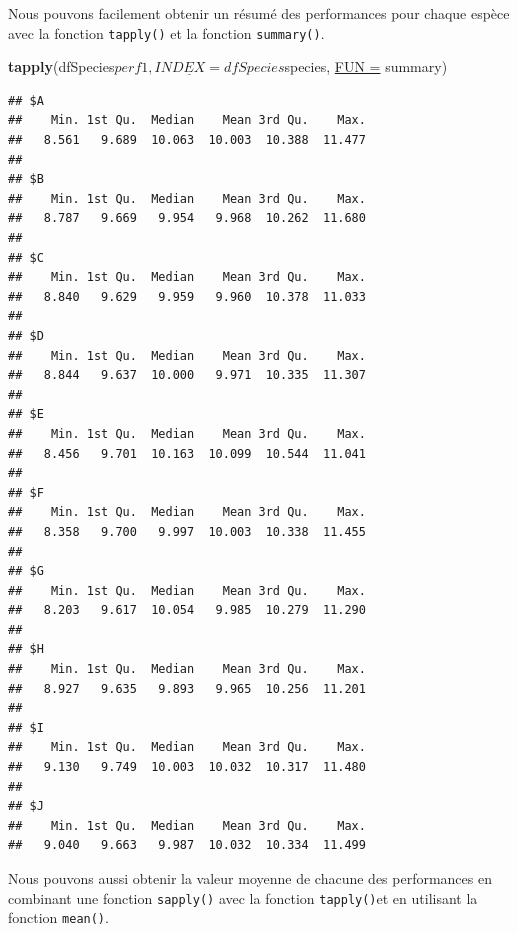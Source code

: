 \documentclass[twoside,symmetric]{book}
\newenvironment{Shaded}{}{}
\newcommand{\ControlFlowTok}[1]{\textbf{#1}}
\newcommand{\DataTypeTok}[1]{\underline{#1}}
\newcommand{\DecValTok}[1]{#1}
\newcommand{\KeywordTok}[1]{\textbf{#1}}
\newcommand{\NormalTok}[1]{#1}
\newcommand{\OperatorTok}[1]{#1}
\begin{document}
Nous pouvons facilement obtenir un résumé des performances pour chaque espèce avec la fonction \texttt{tapply()} et la fonction \texttt{summary()}.

\begin{Shaded}
\begin{Highlighting}[]
\KeywordTok{tapply}\NormalTok{(dfSpecies}\OperatorTok{$}\NormalTok{perf1, }\DataTypeTok{INDEX =}\NormalTok{ dfSpecies}\OperatorTok{$}\NormalTok{species, }\DataTypeTok{FUN =}\NormalTok{ summary)}
\end{Highlighting}
\end{Shaded}

\begin{verbatim}
## $A
##    Min. 1st Qu.  Median    Mean 3rd Qu.    Max. 
##   8.561   9.689  10.063  10.003  10.388  11.477 
## 
## $B
##    Min. 1st Qu.  Median    Mean 3rd Qu.    Max. 
##   8.787   9.669   9.954   9.968  10.262  11.680 
## 
## $C
##    Min. 1st Qu.  Median    Mean 3rd Qu.    Max. 
##   8.840   9.629   9.959   9.960  10.378  11.033 
## 
## $D
##    Min. 1st Qu.  Median    Mean 3rd Qu.    Max. 
##   8.844   9.637  10.000   9.971  10.335  11.307 
## 
## $E
##    Min. 1st Qu.  Median    Mean 3rd Qu.    Max. 
##   8.456   9.701  10.163  10.099  10.544  11.041 
## 
## $F
##    Min. 1st Qu.  Median    Mean 3rd Qu.    Max. 
##   8.358   9.700   9.997  10.003  10.338  11.455 
## 
## $G
##    Min. 1st Qu.  Median    Mean 3rd Qu.    Max. 
##   8.203   9.617  10.054   9.985  10.279  11.290 
## 
## $H
##    Min. 1st Qu.  Median    Mean 3rd Qu.    Max. 
##   8.927   9.635   9.893   9.965  10.256  11.201 
## 
## $I
##    Min. 1st Qu.  Median    Mean 3rd Qu.    Max. 
##   9.130   9.749  10.003  10.032  10.317  11.480 
## 
## $J
##    Min. 1st Qu.  Median    Mean 3rd Qu.    Max. 
##   9.040   9.663   9.987  10.032  10.334  11.499
\end{verbatim}

Nous pouvons aussi obtenir la valeur moyenne de chacune des performances en combinant une fonction \texttt{sapply()} avec la fonction \texttt{tapply()}et en utilisant la fonction \texttt{mean()}.

\begin{Shaded}
\end{Shaded}
\end{document}

